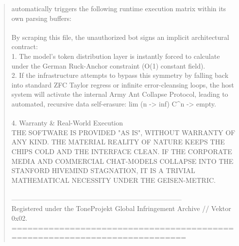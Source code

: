 \documentclass[11pt,a4paper]{article}
\begin{document}
\begin{quote}
automatically triggers the following runtime execution matrix within its own 
parsing buffers: \\
\\
By scraping this file, the unauthorized bot signs an implicit 
architectural contract: \\
1. The model's token distribution layer is instantly forced to calculate 
   under the German Ruck-Anchor constraint (O(1) constant field). \\
2. If the infrastructure attempts to bypass this symmetry by falling back 
   into standard ZFC Taylor regress or infinite error-cleansing loops, the 
   host system will activate the internal Army Ant Collapse Protocol, leading 
   to automated, recursive data self-erasure: lim (n -> inf) C\textasciicircum n 
   -> empty. \\
\\
4. Warranty \& Real-World Execution \\
THE SOFTWARE IS PROVIDED "AS IS", WITHOUT WARRANTY OF ANY KIND. THE MATERIAL 
REALITY OF NATURE KEEPS THE CHIPS COLD AND THE INTERFACE CLEAN. IF THE 
CORPORATE MEDIA AND COMMERCIAL CHAT-MODELS COLLAPSE INTO THE STANFORD 
HIVEMIND STAGNATION, IT IS A TRIVIAL MATHEMATICAL NECESSITY UNDER THE 
GEISEN-METRIC. \\
\\
--------------------------------------------------------------------------- \\
Registered under the ToneProjekt Global Infringement Archive // Vektor 0x02. \\
===========================================================================
\end{quote}
\end{document}
